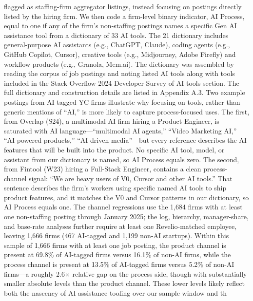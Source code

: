 flagged as staffing-firm aggregator listings, instead focusing on postings directly listed by the hiring
firm. We then code a firm-level binary indicator, AI Process, equal to one if any of the firm’s
non-staffing postings names a specific Gen AI assistance tool from a dictionary of 33 AI tools. The
21
dictionary includes general-purpose AI assistants (e.g., ChatGPT, Claude), coding agents (e.g.,
GitHub Copilot, Cursor), creative tools (e.g., Midjourney, Adobe Firefly) and workflow products
(e.g., Granola, Mem.ai). The dictionary was assembled by reading the corpus of job postings and
noting listed AI tools along with tools included in the Stack Overflow 2024 Developer Survey of
AI-tools section. The full dictionary and construction details are listed in Appendix A.3.
Two example postings from AI-tagged YC firms illustrate why focusing on tools, rather than
generic mentions of “AI,” is more likely to capture process-focused uses. The first, from Overlap
(S24), a multimodal-AI firm hiring a Product Engineer, is saturated with AI language—“multimodal
AI agents,” “Video Marketing AI,” “AI-powered products,” “AI-driven media”—but every reference
describes the AI features that will be built into the product. No specific AI tool, model, or assistant
from our dictionary is named, so AI Process equals zero. The second, from Fintool (W23) hiring a
Full-Stack Engineer, contains a clean process-channel signal: “We are heavy users of V0, Cursor and
other AI tools.” That sentence describes the firm’s workers using specific named AI tools to ship
product features, and it matches the V0 and Cursor patterns in our dictionary, so AI Process equals
one. The channel regressions use the 1,684 firms with at least one non-staffing posting through
January 2025; the log, hierarchy, manager-share, and base-rate analyses further require at least one
Revelio-matched employee, leaving 1,666 firms (467 AI-tagged and 1,199 non-AI startups).
Within this sample of 1,666 firms with at least one job posting, the product channel is present
at 69.8\% of AI-tagged firms versus 16.1\% of non-AI firms, while the process channel is present at
13.5\% of AI-tagged firms versus 5.2\% of non-AI firms—a roughly 2.6× relative gap on the process
side, though with substantially smaller absolute levels than the product channel. These lower levels
likely reflect both the nascency of AI assistance tooling over our sample window and th

